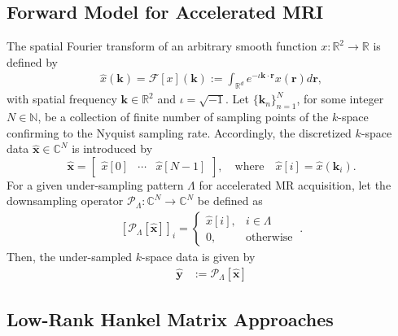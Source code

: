 \documentclass[10pt,journal]{IEEEtran}
\newcommand{\bk}{\mathbf{k}}
\newcommand{\NN}{\mathbb{N}}
\newcommand{\RR}{\mathbb{R}}
\newcommand{\kb}{{\mathbf k}}
\newcommand{\rb}{{\mathbf r}}
\newcommand{\xb}{{\mathbf x}}
\newcommand{\yb}{{\mathbf y}}
\newcommand{\Cd}{{\mathbb C}}
\newcommand{\0}{{\boldsymbol{0}}}
\newcommand{\Pc}{{\mathcal P}}
\begin{document}
\subsection{Forward Model for Accelerated MRI}




The spatial Fourier transform of an arbitrary smooth function $x:\RR^2\to\RR$ is defined by 
\begin{align*}
\hat{x}(\bk)=\mathcal{F}[x](\bk):=\int_{\RR^d} e^{-\iota\bk\cdot \rb}x(\rb)d\rb,
\end{align*}
with spatial frequency $\bk\in\RR^2$ and $\iota=\sqrt{-1}$.
Let  $\{\bk_n\}_{n=1}^N$, for some integer $N\in\NN$, be a collection of finite number of sampling points of the $k$-space
 confirming to the Nyquist sampling rate. 
 Accordingly, the discretized $k$-space data  $\widehat\xb\in \Cd^N$  is introduced by
\begin{equation}\label{eq:coil}
\widehat \xb = \begin{bmatrix} \hat x[0] &\cdots & \hat x[N-1]\end{bmatrix}, 
\quad \mbox{where} \quad \hat x[i] = \widehat x(\kb_i) . \end{equation}
For a given under-sampling pattern $\Lambda$ for accelerated MR acquisition, let 
  the downsampling operator $\Pc_\Lambda: \Cd^{N} \to \Cd^{N}$ 
  be defined as
  \begin{eqnarray}
  \left[\Pc_\Lambda[\hat \xb] \right]_i= \begin{cases}  \widehat x[i], &i \in \Lambda \\
0, &  \mbox{otherwise} \end{cases}   \   .
  \end{eqnarray}
Then, the under-sampled  $k$-space data is given by
\begin{eqnarray}\label{eq:fwd}
\hat \yb & :=\Pc_\Lambda[\hat \xb] 
\end{eqnarray}




\subsection{Low-Rank Hankel Matrix Approaches} \label{sec:theory}
\end{document}
